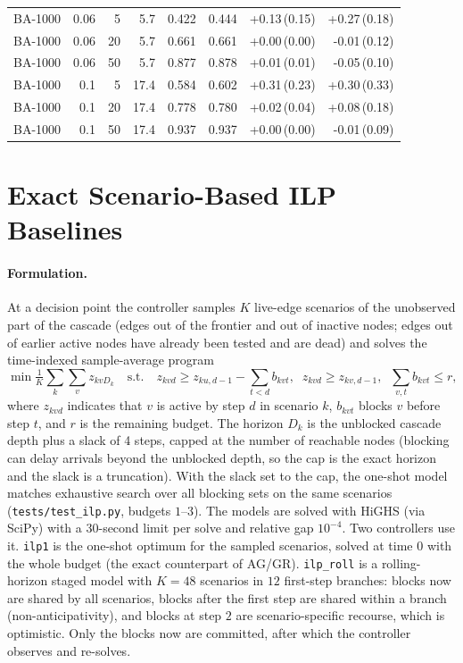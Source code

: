 \documentclass[ijoc,sglanonrev]{informs4}
\begin{document}
\begin{table}[h]
{\begin{tabular}{lrrrrrrr}
BA-1000 & 0.06 & 5 & 5.7 & 0.422 & 0.444 & +0.13\,(0.15) & +0.27\,(0.18) \\
BA-1000 & 0.06 & 20 & 5.7 & 0.661 & 0.661 & +0.00\,(0.00) & -0.01\,(0.12) \\
BA-1000 & 0.06 & 50 & 5.7 & 0.877 & 0.878 & +0.01\,(0.01) & -0.05\,(0.10) \\
BA-1000 & 0.1 & 5 & 17.4 & 0.584 & 0.602 & +0.31\,(0.23) & +0.30\,(0.33) \\
BA-1000 & 0.1 & 20 & 17.4 & 0.778 & 0.780 & +0.02\,(0.04) & +0.08\,(0.18) \\
BA-1000 & 0.1 & 50 & 17.4 & 0.937 & 0.937 & +0.00\,(0.00) & -0.01\,(0.09) \\
\hline
\end{tabular}}{}
\end{table}

\section{Exact Scenario-Based ILP Baselines}\label{ec:ilp}

\paragraph{Formulation.} At a decision point the controller samples $K$
live-edge scenarios of the unobserved part of the cascade (edges out of the
frontier and out of inactive nodes; edges out of earlier active nodes have
already been tested and are dead) and solves the time-indexed sample-average
program
\[
\min \tfrac1K\sum_k\sum_v z_{kvD_k}\quad\text{s.t.}\quad
z_{kvd}\ge z_{ku,d-1}-\sum_{t<d}b_{kvt},\;\; z_{kvd}\ge z_{kv,d-1},\;\;
\sum_{v,t}b_{kvt}\le r,
\]
where $z_{kvd}$ indicates that $v$ is active by step $d$ in scenario $k$,
$b_{kvt}$ blocks $v$ before step $t$, and $r$ is the remaining budget. The
horizon $D_k$ is the unblocked cascade depth plus a slack of 4 steps, capped at
the number of reachable nodes (blocking can delay arrivals beyond the unblocked
depth, so the cap is the exact horizon and the slack is a truncation). With
the slack set to the cap, the one-shot model matches exhaustive search over all
blocking sets on the same scenarios (\texttt{tests/test\_ilp.py}, budgets
$1$--$3$). The models are solved with HiGHS (via SciPy) with a 30-second limit per
solve and relative gap $10^{-4}$. Two controllers use it.
\texttt{ilp1} is the one-shot optimum for the sampled scenarios, solved at time
$0$ with the whole budget (the exact counterpart of AG/GR).
\texttt{ilp\_roll} is a rolling-horizon staged model with $K=48$ scenarios in
$12$ first-step branches: blocks now are shared by all scenarios, blocks after
the first step are shared within a branch (non-anticipativity), and blocks at
step $2$ are scenario-specific recourse, which is optimistic. Only the blocks
now are committed, after which the controller observes and re-solves.
\end{document}
